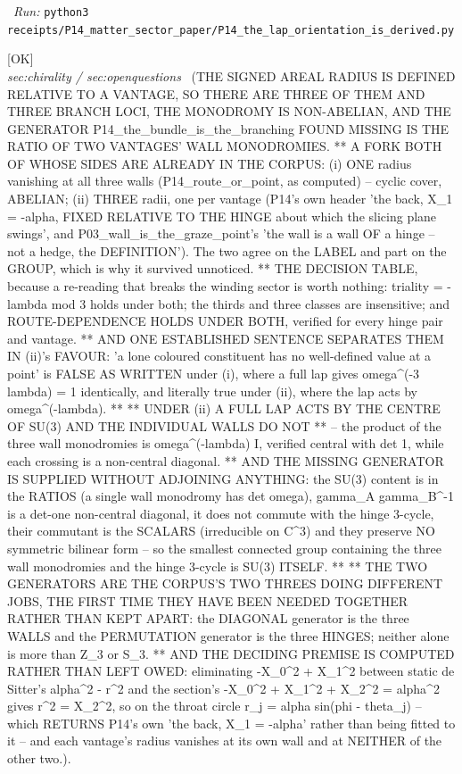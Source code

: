 \begin{description}
\ \emph{Run:} \texttt{python3 receipts/P14\_matter\_sector\_paper/P14\_the\_lap\_orientation\_is\_derived.py}
\item[\label{rcpt:P14_the_wall_is_a_wall_of_a_hinge}\texttt{P14\_the\_wall\_is\_a\_wall\_of\_a\_hinge}]\hfill\textsf{[OK]}\\
\textit{sec:chirality / sec:openquestions} \ (THE SIGNED AREAL RADIUS IS DEFINED RELATIVE TO A VANTAGE, SO THERE ARE THREE OF THEM AND THREE BRANCH LOCI, THE MONODROMY IS NON-ABELIAN, AND THE GENERATOR P14\_the\_bundle\_is\_the\_branching FOUND MISSING IS THE RATIO OF TWO VANTAGES' WALL MONODROMIES. ** A FORK BOTH OF WHOSE SIDES ARE ALREADY IN THE CORPUS: (i) ONE radius vanishing at all three walls (P14\_route\_or\_point, as computed) -- cyclic cover, ABELIAN; (ii) THREE radii, one per vantage (P14's own header 'the back, X\_1 = -alpha, FIXED RELATIVE TO THE HINGE about which the slicing plane swings', and P03\_wall\_is\_the\_graze\_point's 'the wall is a wall OF a hinge -- not a hedge, the DEFINITION'). The two agree on the LABEL and part on the GROUP, which is why it survived unnoticed. ** THE DECISION TABLE, because a re-reading that breaks the winding sector is worth nothing: triality = -lambda mod 3 holds under both; the thirds and three classes are insensitive; and ROUTE-DEPENDENCE HOLDS UNDER BOTH, verified for every hinge pair and vantage. ** AND ONE ESTABLISHED SENTENCE SEPARATES THEM IN (ii)'s FAVOUR: 'a lone coloured constituent has no well-defined value at a point' is FALSE AS WRITTEN under (i), where a full lap gives omega\textasciicircum{}(-3 lambda) = 1 identically, and literally true under (ii), where the lap acts by omega\textasciicircum{}(-lambda). ** ** UNDER (ii) A FULL LAP ACTS BY THE CENTRE OF SU(3) AND THE INDIVIDUAL WALLS DO NOT ** -- the product of the three wall monodromies is omega\textasciicircum{}(-lambda) I, verified central with det 1, while each crossing is a non-central diagonal. ** AND THE MISSING GENERATOR IS SUPPLIED WITHOUT ADJOINING ANYTHING: the SU(3) content is in the RATIOS (a single wall monodromy has det omega), gamma\_A gamma\_B\textasciicircum{}-1 is a det-one non-central diagonal, it does not commute with the hinge 3-cycle, their commutant is the SCALARS (irreducible on C\textasciicircum{}3) and they preserve NO symmetric bilinear form -- so the smallest connected group containing the three wall monodromies and the hinge 3-cycle is SU(3) ITSELF. ** ** THE TWO GENERATORS ARE THE CORPUS'S TWO THREES DOING DIFFERENT JOBS, THE FIRST TIME THEY HAVE BEEN NEEDED TOGETHER RATHER THAN KEPT APART: the DIAGONAL generator is the three WALLS and the PERMUTATION generator is the three HINGES; neither alone is more than Z\_3 or S\_3. ** AND THE DECIDING PREMISE IS COMPUTED RATHER THAN LEFT OWED: eliminating -X\_0\textasciicircum{}2 + X\_1\textasciicircum{}2 between static de Sitter's alpha\textasciicircum{}2 - r\textasciicircum{}2 and the section's -X\_0\textasciicircum{}2 + X\_1\textasciicircum{}2 + X\_2\textasciicircum{}2 = alpha\textasciicircum{}2 gives r\textasciicircum{}2 = X\_2\textasciicircum{}2, so on the throat circle r\_j = alpha sin(phi - theta\_j) -- which RETURNS P14's own 'the back, X\_1 = -alpha' rather than being fitted to it -- and each vantage's radius vanishes at its own wall and at NEITHER of the other two.). 

\end{description}
